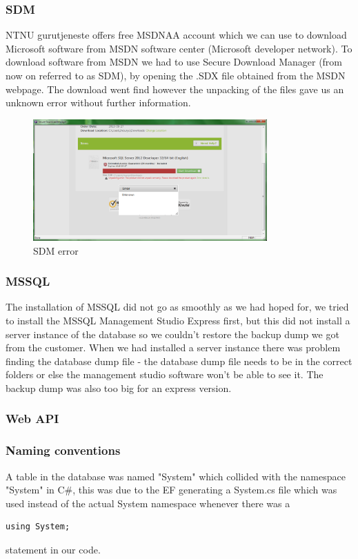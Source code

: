 \subsubsection{SDM}
NTNU gurutjeneste offers free MSDNAA account which we can use to download Microsoft software from MSDN software center (Microsoft developer network). To download software from MSDN we had to use Secure Download Manager (from now on referred to as SDM), by opening the .SDX file obtained from the MSDN webpage. The download went find however the unpacking of the files gave us an unknown error without further information.
\begin{figure}[H]
\centering
\includegraphics[width=0.8\textwidth]{images/issue00.png}
\caption{SDM error}
\label{fig:SDM_error}
\end{figure}

\subsubsection{MSSQL}
The installation of MSSQL did not go as smoothly as we had hoped for, we tried to install the MSSQL Management Studio Express first, but this did not install a server instance of the database so we couldn't restore the backup dump we got from the customer. When we had installed a server instance there was problem finding the database dump file - the database dump file needs to be in the correct folders or else the management studio software won't be able to see it. The backup dump was also too big for an express version.

\subsubsection{Web API}
\label{subsubsec:webapiissues}

\subsubsection{Naming conventions}
A table in the database was named "System" which collided with the namespace "System" in C\#, this was due to the EF generating a System.cs file which was used instead of the actual System namespace whenever there was a 
\begin{lstlisting}
using System;
\end{lstlisting}
statement in our code.


